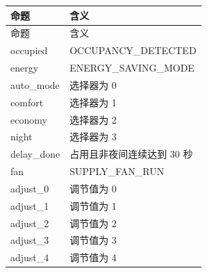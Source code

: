 \begin{longtable}{L{3.3cm}L{10.0cm}}

\toprule

命题 & 含义\\

\midrule

\endfirsthead

\toprule

命题 & 含义\\

\midrule

\endhead

{\ttfamily occupied} & OCCUPANCY\_DETECTED\\

{\ttfamily energy} & ENERGY\_SAVING\_MODE\\

{\ttfamily auto\_mode} & 选择器为 0\\

{\ttfamily comfort} & 选择器为 1\\

{\ttfamily economy} & 选择器为 2\\

{\ttfamily night} & 选择器为 3\\

{\ttfamily delay\_done} & 占用且非夜间连续达到 30 秒\\

{\ttfamily fan} & SUPPLY\_FAN\_RUN\\

{\ttfamily adjust\_0} & 调节值为 0\\

{\ttfamily adjust\_1} & 调节值为 1\\

{\ttfamily adjust\_2} & 调节值为 2\\

{\ttfamily adjust\_3} & 调节值为 3\\

{\ttfamily adjust\_4} & 调节值为 4\\

\bottomrule

\end{longtable}

